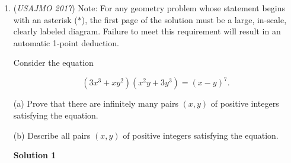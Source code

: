 \begin{enumerate}
 $(2n-1)^{2n+1} + (2n+1)^{2n-1} \equiv (2n+1)(2n)-1+(2n-1)(2n)+1 = 4n \cdot 2n \equiv 0 \pmod{4n}$
\begin{verbatim}
The proof is complete. $\blacksquare$
\end{verbatim}

-AlexLikeMath

 



\textbf{Solution 6 (Motivation for Solution)}

Note that 
 \[a^b+b^a=a^b-a^a+a^a+b^a.\] To get rid of the $a^a+b^a$ part $\pmod{a+b},$ we can use the sum of powers factorization. However, $a$ must be odd for us to do this. If we assume that $a$ is odd,
 \[a^b-a^a+a^a+b^a\equiv a^b-a^a+(a+b)(\text{an integer})\equiv a^b-a^a \equiv a^a\left(a^{b-a}-1\right)\pmod{a+b}.\]Because $a$ and $b$ are relatively prime, $a+b$ cannot divide $a^a.$ Thus, we have to show that there exists an integer $b$ such that for odd $a,$
 \[a^{b-a}\equiv 1 \pmod{a+b}.\]Suppose that $a=2n-1.$ To keep the powers small, we try $b=2n+k$ for small values of $k.$ We can find that $b=2n$ does not work. $b=2n+1$ works though, as $a+b=4n$ and
 \[(2n-1)^{2n+1-2n+1}\equiv (2n-1)^2\equiv 4n^2-4n+1\equiv 4n(n-1)+1 \equiv 1 \pmod{4n}.\]Because $a$ is odd, $b=a+2$ is relatively prime to $a.$ Thus, 
 \[(a,b)=(2n-1,2n+1)\] is a solution for positive $n\ge 2.$ There are infinitely many possible values for $n,$ so the proof is complete. $\blacksquare$ 
 \[\]~BS2012

 


 


	\item (\textit{USAJMO 2017}) Note: For any geometry problem whose statement begins with an asterisk ($*$), the first page of the solution must be a large, in-scale, clearly labeled diagram. Failure to meet this requirement will result in an automatic 1-point deduction. 


 Consider the equation 

 \[\left(3x^3 + xy^2 \right) \left(x^2y + 3y^3 \right) = (x-y)^7.\]


 	(a) Prove that there are infinitely many pairs $(x,y)$ of positive integers satisfying the equation. 


 	(b) Describe all pairs $(x,y)$ of positive integers satisfying the equation. 


 



\textbf{Solution 1}


\end{enumerate}
